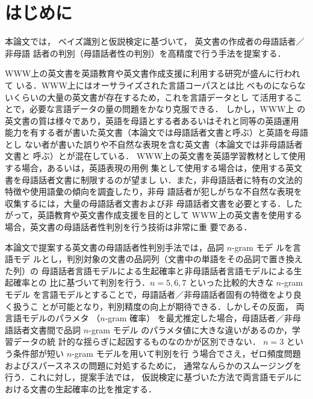 \documentclass[japanese]{jnlp_1.4}
\begin{document}
\maketitle



\section{はじめに}

本論文では，
ベイズ識別と仮説検定に基づいて，
英文書の作成者の母語話者／非母語
話者の判別（母語話者性の判別）を高精度で行う手法を提案する．
 
WWW上の英文書を英語教育や英文書作成支援に利用する研究が盛んに行われて
いる\cite{大鹿,佐野,大武}．WWW上にはオーサライズされた言語コーパスとは比
べものにならないくらいの大量の英文書が存在するため，これを言語データとし
て活用することで，必要な言語データの量の問題をかなり克服できる．
しかし，WWW上
の英文書の質は様々であり，英語を母語とする者あるいはそれと同等の英語運用
能力を有する者が書いた英文書（本論文では母語話者文書と呼ぶ）と英語を母語とし
ない者が書いた誤りや不自然な表現を含む英文書（本論文では非母語話者文書と
呼ぶ）とが混在している．
WWW上の英文書を英語学習教材として使用する場合，あるいは，英語表現の用例
集として使用する場合は，使用する英文書を母語話者文書に制限するのが望まし
い．また，非母語話者に特有の文法的特徴や使用語彙の傾向を調査したり，非母
語話者が犯しがちな不自然な表現を収集するには，大量の母語話者文書および非
母語話者文書を必要とする．したがって，英語教育や英文書作成支援を目的として
WWW上の英文書を使用する場合，英文書の母語話者性判別を行う技術は非常に重
要である．

本論文で提案する英文書の母語話者性判別手法では，品詞 $n$-gram モデ
ルを言語モデ
ルとし，判別対象の文書の品詞列（文書中の単語をその品詞で置き換えた列）の
母語話者言語モデルによる生起確率と非母語話者言語モデルによる生起確率との
比に基づいて判別を行う．$n=5,6,7$ といった比較的大きな $n$-gram モデル
を言語モデルとすることで，母語話者／非母語話者固有の特徴をより良く扱うこ
とが可能となり，判別精度の向上が期待できる．しかしその反面，
両言語モデルのパラメタ
（$n$-gram 確率）
を最尤推定した場合，母語話者／非母語話者文書間で品詞 $n$-gram モデル
のパラメタ値に大きな違いがあるのか，学習データの統
計的な揺らぎに起因するものなのかが区別できない．
$n=3$ という条件部が短い $n$-gram モデルを用いて判別を行
う場合でさえ，ゼロ頻度問題およびスパースネスの問題に対処するために，
通常なんらかのスムージングを行う．これに対し，提案手法では，
仮説検定に基づいた方法で両言語モデルにおける文書の生起確率の比を推定する．
\end{document}
